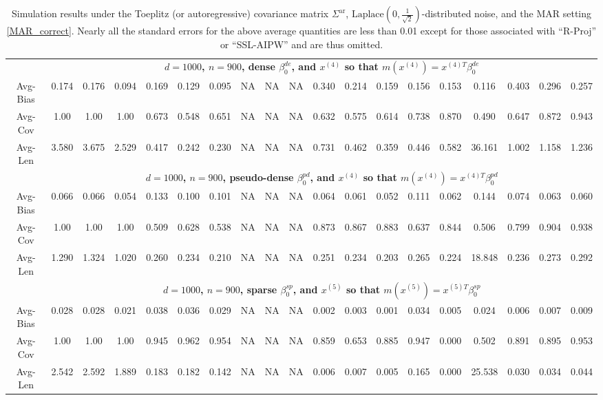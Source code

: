 \documentclass[ejsv2,noshowframe]{imsart}
\theoremstyle{plain}
\theoremstyle{definition}
\theoremstyle{remark}
\begin{document}
\begin{table}[hbtp!]
\begin{center}
{\begin{tabular}{ccccccccccccccccccc}
		& \multicolumn{18}{c}{\bf $d=1000$, $n = 900$, dense $\beta_0^{de}$, and $x^{(4)}$ so that $m(x^{(4)})=x^{(4)T}\beta_0^{de}$} \\ \cline{2-19}
		Avg-Bias & 0.174 & 0.176 & 0.094 & 0.169 & 0.129 & 0.095 & NA & NA & NA & 0.340 & 0.214 & 0.159 & 0.156 & 0.153 & 0.116 & 0.403 & 0.296 & 0.257 \\
		Avg-Cov & 1.00 & 1.00 & 1.00 & 0.673 & 0.548 & 0.651 & NA & NA & NA & 0.632 & 0.575 & 0.614 & 0.738 & 0.870 & 0.490 & 0.647 & 0.872 & 0.943 \\
		Avg-Len & 3.580 & 3.675 & 2.529 & 0.417 & 0.242 & 0.230 & NA & NA & NA & 0.731 & 0.462 & 0.359 & 0.446 & 0.582 & 36.161 & 1.002 & 1.158 & 1.236 \\
		\cline{2-19}
		
		& \multicolumn{18}{c}{\bf $d=1000$, $n = 900$, pseudo-dense $\beta_0^{pd}$, and $x^{(4)}$ so that $m(x^{(4)})=x^{(4)T}\beta_0^{pd}$} \\ \cline{2-19}
		Avg-Bias & 0.066 & 0.066 & 0.054 & 0.133 & 0.100 & 0.101 & NA & NA & NA & 0.064 & 0.061 & 0.052 & 0.111 & 0.062 & 0.144 & 0.074 & 0.063 & 0.060 \\
		Avg-Cov & 1.00 & 1.00 & 1.00 & 0.509 & 0.628 & 0.538 & NA & NA & NA & 0.873 & 0.867 & 0.883 & 0.637 & 0.844 & 0.506 & 0.799 & 0.904 & 0.938 \\
		Avg-Len & 1.290 & 1.324 & 1.020 & 0.260 & 0.234 & 0.210 & NA & NA & NA & 0.251 & 0.234 & 0.203 & 0.265 & 0.224 & 18.848 & 0.236 & 0.273 & 0.292 \\
		\hline
		
		& \multicolumn{18}{c}{\bf $d=1000$, $n = 900$, sparse $\beta_0^{sp}$, and $x^{(5)}$ so that $m(x^{(5)})=x^{(5)T}\beta_0^{sp}$} \\ \cline{2-19}
		Avg-Bias & 0.028 & 0.028 & 0.021 & 0.038 & 0.036 & 0.029 & NA & NA & NA & 0.002 & 0.003 & 0.001 & 0.034 & 0.005 & 0.024 & 0.006 & 0.007 & 0.009 \\
		Avg-Cov & 1.00 & 1.00 & 1.00 & 0.945 & 0.962 & 0.954 & NA & NA & NA & 0.859 & 0.653 & 0.885 & 0.947 & 0.000 & 0.502 & 0.891 & 0.895 & 0.953 \\
		Avg-Len & 2.542 & 2.592 & 1.889 & 0.183 & 0.182 & 0.142 & NA & NA & NA & 0.006 & 0.007 & 0.005 & 0.165 & 0.000 & 25.538 & 0.030 & 0.034 & 0.044 \\
		
		\hline\hline
\end{tabular}}
\caption{Simulation results under the Toeplitz (or autoregressive) covariance matrix $\Sigma^{\mathrm{ar}}$, $\mathrm{Laplace}\left(0, \frac{1}{\sqrt{2}} \right)$-distributed noise, and the MAR setting \eqref{MAR_correct}. Nearly all the standard errors for the above average quantities are less than 0.01 except for those associated with ``R-Proj'' or ``SSL-AIPW'' and are thus omitted.}
\label{table:AR_MAR_laperr_res}
\end{center}
\end{table}
\end{document}

